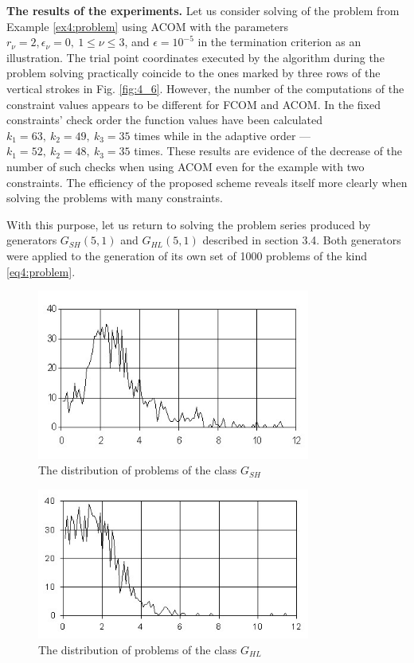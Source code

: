 \textbf{The results of the experiments.} Let us consider solving of the problem from Example \ref{ex4:problem} using ACOM with the parameters $r_\nu=2, \epsilon_\nu=0,\: 1\le \nu\le 3$, and $\epsilon=10^{-5}$ in the termination criterion as an illustration. The trial point coordinates executed by the algorithm during the
problem solving practically coincide to the ones marked by three rows of the vertical strokes in Fig. \ref{fig:4_6}. However, the number of the computations of the constraint values appears to be different for FCOM and ACOM. In the fixed constraints’ check order the function values have been calculated $k_1 =63,\: k_2 =49,\: k_3 =35$ times while in the adaptive order --- $k_1 =52,\: k_2 =48,\:
k_3 =35$ times. These results are evidence of the decrease of the number of such checks when using ACOM even for the example with two constraints. The efficiency of the proposed scheme reveals itself more clearly when solving the problems with many constraints.

With this purpose, let us return to solving the problem series produced by generators $G_{SH}(5,1)$ and $G_{HL} (5,1)$ described in section 3.4. Both generators were applied to the generation of
its own set of 1000 problems of the kind \eqref{eq4:problem}.

\begin{figure}[ht]
  \centering
  \includegraphics[width=0.8\textwidth]{figures/4_11.jpg}
  \caption{The distribution of problems of the class $G_{SH}$}
  \label{fig:4_11}
\end{figure}

\begin{figure}[ht]
  \centering
  \includegraphics[width=0.8\textwidth]{figures/4_12.jpg}
  \caption{The distribution of problems of the class $G_{HL}$}
  \label{fig:4_12}
\end{figure}

